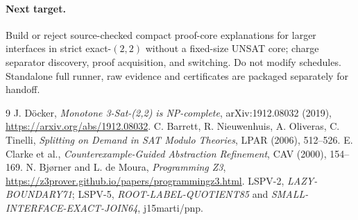\documentclass[11pt]{article}
\begin{document}
\paragraph{Next target.}
Build or reject source-checked compact proof-core explanations for larger interfaces in strict exact-$(2,2)$ without a fixed-size UNSAT core; charge separator discovery, proof acquisition, and switching. Do not modify schedules. Standalone full runner, raw evidence and certificates are packaged separately for handoff.
\begin{thebibliography}{9}
 J. D\"ocker, \emph{Monotone 3-Sat-(2,2) is NP-complete}, arXiv:1912.08032 (2019), \url{https://arxiv.org/abs/1912.08032}.
 C. Barrett, R. Nieuwenhuis, A. Oliveras, C. Tinelli, \emph{Splitting on Demand in SAT Modulo Theories}, LPAR (2006), 512--526.
 E. Clarke et al., \emph{Counterexample-Guided Abstraction Refinement}, CAV (2000), 154--169.
 N. Bj{\o}rner and L. de Moura, \emph{Programming Z3}, \url{https://z3prover.github.io/papers/programmingz3.html}.
 LSPV-2, \emph{LAZY-BOUNDARY71}; LSPV-5, \emph{ROOT-LABEL-QUOTIENT85} and \emph{SMALL-INTERFACE-EXACT-JOIN64}, j15marti/pnp.
\end{thebibliography}
\end{document}
